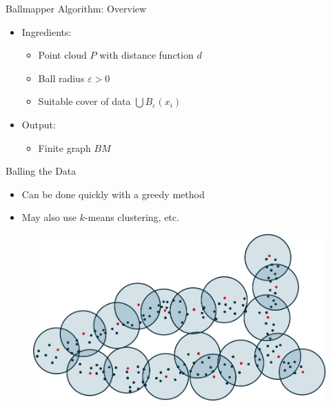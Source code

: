\documentclass{beamer}
\begin{document}
\begin{frame}{Ballmapper Algorithm: Overview}
  \begin{itemize}
    \item Ingredients:
    \begin{itemize}
      \item Point cloud $P$ with distance function $d$
      \item Ball radius $\varepsilon > 0$
      \item Suitable cover of data $\bigcup B_\varepsilon(x_i)$
    \end{itemize}
    \item Output:
    \begin{itemize}
      \item Finite graph $BM$
    \end{itemize}
  \end{itemize}
\end{frame}

\begin{frame}{Balling the Data}
  \begin{itemize}
    \item Can be done quickly with a greedy method
    \item May also use $k$-means clustering, etc.
  \end{itemize}
  \begin{figure}
    \begin{center}
      \includegraphics[width=1\textwidth]{ballcover.png}
    \end{center}
  \end{figure}

\end{frame}
\end{document}
